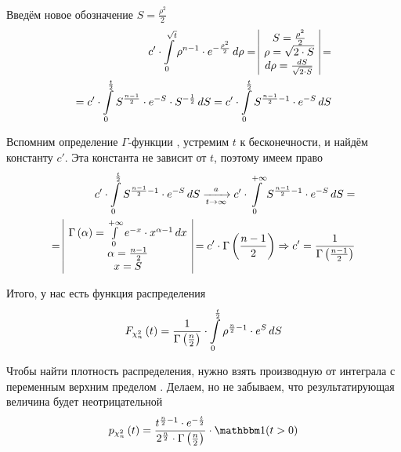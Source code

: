 Введём новое обозначение $S = \frac{\rho^2}{2}$
\begin{align*}
    c' \cdot \integral{0}{\sqrt{t}}{\rho}{
        \rho^{n-1} \cdot e^{- \frac{\rho^2}{2}}}
    = \begin{array}{|c|}
        S = \frac{\rho^2}{2} \\
        \rho = \sqrt{2 \cdot S} \\
        d\rho = \frac{dS}{\sqrt{2 \cdot S}}
    \end{array} = \\
    = c' \cdot \integral{0}{\frac{t}{2}}{S}{
        S^{\frac{n-1}{2}} \cdot e^{-S} \cdot S^{-\frac{1}{2}}}
    = c' \cdot \integral{0}{\frac{t}{2}}{S}{
        S^{\frac{n-1}{2} - 1} \cdot e^{-S}}
\end{align*}

Вспомним определение $\Gamma$-функции \cite[с.~416]{DorogovtsevMA}, устремим
$t$ к бесконечности, и найдём константу $c'$. Эта константа не зависит от
$t$, поэтому имеем право
\begin{align*}
    c' \cdot \integral{0}{\frac{t}{2}}{S}{
        S^{\frac{n-1}{2} - 1} \cdot e^{-S}}
    \covergencen{t}{a}
    c' \cdot \integral{0}{+\infty}{S}{
        S^{\frac{n-1}{2} - 1} \cdot e^{-S}} = \\
    = \begin{array}{|c|}
        \Gamma\left( \alpha \right)
            = \integral{0}{+\infty}{x}{e^{-x} \cdot x^{\alpha-1}} \\
        \alpha = \frac{n-1}{2} \\
        x = S
    \end{array}
    = c' \cdot \Gamma\left( \frac{n-1}{2} \right)
    \Rightarrow c' = \frac{1}{\Gamma\left( \frac{n-1}{2} \right)}
\end{align*}

Итого, у нас есть функция распределения
\begin{align*}
    \cdfof{\chi_n^2}{t}
    =  \frac{1}{\Gamma\left( \frac{n}{2} \right)} \cdot
        \integral{0}{\frac{t}{2}}{S}{\rho^{\frac{n}{2}-1} \cdot e^S}
\end{align*}

Чтобы найти плотность распределения, нужно взять производную от интеграла
с переменным верхним пределом \cite[с.~353]{IlinMA1}. Делаем, но не забываем,
что результатирующая величина будет неотрицательной
\begin{align*}
    \pdfof{\chi_n^2}{t}
    = \frac{t^{\frac{n}{2}-1} \cdot e^{-\frac{t}{2}}}{
            2^{\frac{n}{2}} \cdot \Gamma\left( \frac{n}{2} \right)}
        \cdot \indicator{t>0}
\end{align*}

